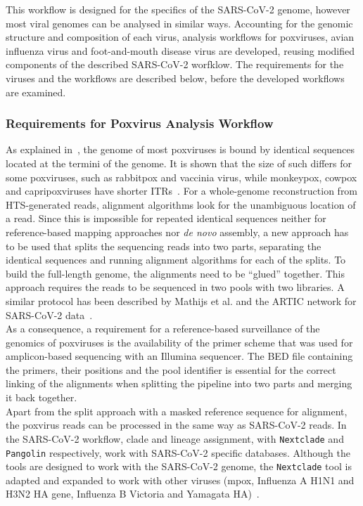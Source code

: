This workflow is designed for the specifics of the SARS-CoV-2 genome, however most viral genomes can be analysed in similar ways. Accounting for the genomic structure and composition of each virus, analysis workflows for poxviruses, avian influenza virus and foot-and-mouth disease virus are developed, reusing modified components of the described \ac{SARS-CoV-2} worfklow. The requirements for the viruses and the workflows are described below, before the developed workflows are examined. %

\subsubsection{Requirements for Poxvirus Analysis Workflow}
As explained in~, the genome of most poxviruses is bound by identical sequences located at the termini of the genome. It is shown that the size of such differs for some poxviruses, such as rabbitpox and vaccinia virus, while monkeypox, cowpox and capripoxviruses have shorter \acp{ITR}~\cite{wittek1978inverted}. For a whole-genome reconstruction from \ac{HTS}-generated reads, alignment algorithms look for the unambiguous location of a read. Since this is impossible for repeated identical sequences neither for reference-based mapping approaches nor \textit{de novo} assembly, a new approach has to be used that splits the sequencing reads into two parts, separating the identical sequences and running alignment algorithms for each of the splits. To build the full-length genome, the alignments need to be ``glued'' together. This approach requires the reads to be sequenced in two pools with two libraries. A similar protocol has been described by Mathijs et al. and the ARTIC network for SARS-CoV-2 data~\cite{mathijs2022robust, tyson2020improvements}. \\
As a consequence, a requirement for a reference-based surveillance of the genomics of poxviruses is the availability of the primer scheme that was used for amplicon-based sequencing with an Illumina sequencer. The \ac{BED} file containing the primers, their positions and the pool identifier is essential for the correct linking of the alignments when splitting the pipeline into two parts and merging it back together. \\
Apart from the split approach with a masked reference sequence for alignment, the poxvirus reads can be processed in the same way as \ac{SARS-CoV-2} reads. In the \ac{SARS-CoV-2} workflow, clade and lineage assignment, with \texttt{Nextclade} and \texttt{Pangolin} respectively, work with \ac{SARS-CoV-2} specific databases. Although the tools are designed to work with the \ac{SARS-CoV-2} genome, the \texttt{Nextclade} tool is adapted and expanded to work with other viruses (mpox, Influenza A H1N1 and H3N2 HA gene, Influenza B Victoria and Yamagata HA)~\cite{aksamentov2021nextclade}.

